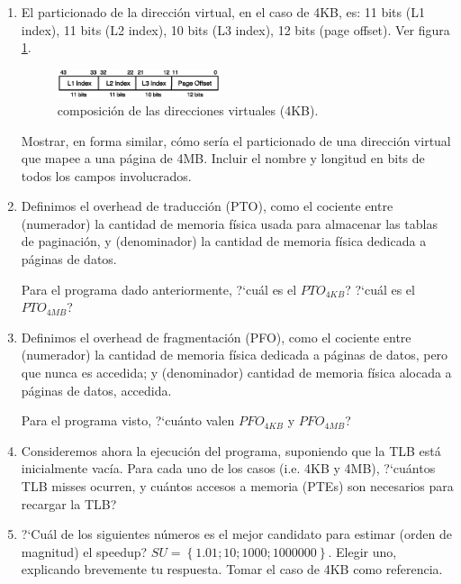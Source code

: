     \begin{enumerate}
    \item	El particionado de la dirección virtual, en el caso de 4KB,
	    es: 11 bits (L1 index), 11 bits (L2 index), 10 bits (L3 index),
	    12 bits (page offset). Ver figura \ref{fig::vaddr4k}.

	    \begin{figure}[!ht]
	    \centering
	    \includegraphics[width=0.45\textwidth]{./gfx/vaddr.eps}
	    \caption{composición de las direcciones virtuales (4KB).}
	    \label{fig::vaddr4k}
	    \end{figure}

	    Mostrar, en forma similar, cómo sería el particionado de una
	    dirección virtual que mapee a una página de 4MB. Incluir el
	    nombre y longitud en bits de todos los campos involucrados.
    
    \item	Definimos el overhead de traducción (PTO), como el cociente 
	    entre (numerador) la cantidad de memoria física usada para
	    almacenar las tablas de paginación, y (denominador) la cantidad
	    de memoria física dedicada a páginas de datos.

	    Para el programa dado anteriormente, ?`cuál es el $PTO_{4KB}$?
	    ?`cuál es el $PTO_{4MB}$?

    \item	Definimos el overhead de fragmentación (PFO), como el cociente
	    entre (numerador) la cantidad de memoria física dedicada a
	    páginas de datos, pero que nunca es accedida; y (denominador)
	    cantidad de memoria física alocada a páginas de datos, 
	    accedida.

	    Para el programa visto, ?`cuánto valen $PFO_{4KB}$ y
	    $PFO_{4MB}$?

    \item	Consideremos ahora la ejecución del programa, suponiendo que
	    la TLB está inicialmente vacía. Para cada uno de los casos
	    (i.e. 4KB y 4MB), ?`cuántos TLB misses ocurren, y cuántos
	    accesos a memoria (PTEs) son necesarios para recargar la TLB?

    \item	?`Cuál de los siguientes números es el mejor candidato para
	    estimar (orden de magnitud) el speedup? 
	    $SU = \left\{1.01; 10; 1000; 1000000\right\}$. Elegir uno, 
	    explicando brevemente tu respuesta. Tomar el caso de 4KB como
	    referencia.
    \end{enumerate}


